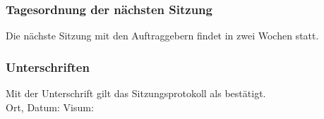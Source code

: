 \subsubsection{Tagesordnung der nächsten Sitzung}
Die nächste Sitzung mit den Auftraggebern findet in zwei Wochen statt. 
\subsubsection{Unterschriften}

Mit der Unterschrift gilt das Sitzungsprotokoll als bestätigt.\\

Ort, Datum:	\underline{\hspace*{6cm}}	\hspace*{1cm} Visum:	\underline{\hspace*{4cm}}
